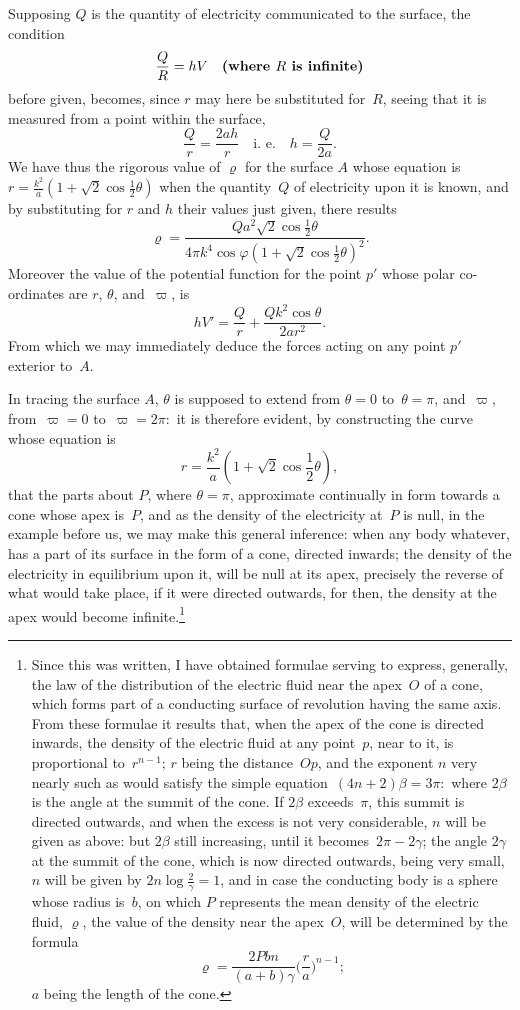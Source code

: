 \documentclass[12pt,notitlepage]{amsart}
\let\Emphasis\textbf
\renewcommand{\rho}{\varrho}
\renewcommand{\phi}{\varphi}
\begin{document}
Supposing $Q$ is the quantity of electricity communicated to the surface, the
condition
\[
\frac QR=hV\quad\text{\Emphasis{(where $R$ is infinite)}}
\]
before given, becomes, since $r$ may here be substituted for~$R$, seeing that
it is measured from a point within the surface,
\[
\frac Qr=\frac{2ah}{r}
\quad\text{i.~e.}\quad
h=\frac{Q}{2a}.
\]
We have thus the rigorous value of $\rho$ for the surface $A$ whose equation is
$r=\frac{k^2}{a}(1+\sqrt2\cos\frac12\theta)$
when the quantity~$Q$ of electricity upon it is known,
and by substituting for $r$ and $h$ their values just given, there results
\[
\rho=\frac{Qa^2\sqrt2\cos\frac12\theta}
{4\pi k^4\cos\phi(1+\sqrt2\cos\frac12\theta)^2}.
\]
Moreover the value of the potential function for the point $p'$
whose polar co-ordinates are $r$, $\theta$, and~$\varpi$, is
\[
hV'=\frac Qr+\frac{Qk^2\cos\theta}{2ar^2}.
\]
From which we may immediately deduce the forces acting on any point $p'$
exterior to~$A$.

In tracing the surface $A$,
$\theta$ is supposed to extend from $\theta=0$ to~$\theta=\pi$,
and~$\varpi$, from~$\varpi=0$ to~$\varpi=2\pi:$
it is therefore evident, by constructing the
curve whose equation is
\[
r=\frac{k^2}{a}(1+\sqrt2\cos\frac12\theta),
\]
that the parts about $P$, where $\theta=\pi$,
approximate continually in form towards
a cone whose apex is~$P$,
and as the density of the electricity at~$P$ is null,
in the example before us, we may make this general inference: when any
body whatever, has a part of its surface in the form of a cone, directed
inwards; the density of the electricity in equilibrium upon it,
will be null at its
apex, precisely the reverse of what would take place, if it were directed
outwards, for then, the density at the apex would become
infinite.\footnote{Since this was written,
I have obtained formulae serving to express, generally,
the law of the distribution of the
electric fluid near the apex~$O$ of a cone, which forms
part of a conducting surface of revolution
having the same axis. From these formulae
it results that, when the apex of the cone is
directed inwards, the density of the electric
fluid at any point~$p$, near to it,
is proportional to~$r^{n-1}$; $r$ being the distance~$Op$, and
the exponent $n$ very nearly such as would satisfy
the simple equation~${(4n+2)\beta=3\pi:}$
where $2\beta$ is the angle at the summit of the cone.
If $2\beta$ exceeds~$\pi$, this summit is directed
outwards, and when the excess is not very considerable,
$n$ will be given as above:
but $2\beta$ still increasing,
until it becomes~$2\pi-2\gamma$;
the angle $2\gamma$ at the summit of the cone,
which is now directed outwards, being very small,
$n$ will be given by $2n\log\frac2\gamma=1$,
and in case the conducting body is a sphere whose radius is~$b$,
on which $P$ represents
the mean density of the electric fluid,
$\rho$, the value of the density near the apex~$O$, will
be determined by the formula
\[
\rho=\frac{2Pbn}{(a+b)\gamma}\biggl(\frac ra\biggr)^{n-1};
\]
$a$ being the length of the cone.}
\end{document}
